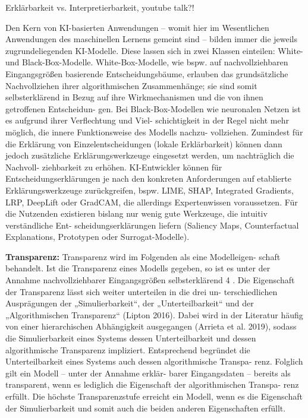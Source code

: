 \documentclass[11pt,a4paper]{article}
\numberwithin{equation}{section}
\begin{document}
	Erklärbarkeit vs. Interpretierbarkeit, youtube talk?!
	
	
	Den Kern von KI-basierten Anwendungen – womit hier im Wesentlichen Anwendungen des
	maschinellen Lernens gemeint sind – bilden immer die jeweils zugrundeliegenden KI-Modelle.
	Diese lassen sich in zwei Klassen einteilen: White- und Black-Box-Modelle. White-Box-Modelle,
	wie bspw. auf nachvollziehbaren Eingangsgrößen basierende Entscheidungsbäume, erlauben
	das grundsätzliche Nachvollziehen ihrer algorithmischen Zusammenhänge; sie sind somit
	selbsterklärend in Bezug auf ihre Wirkmechanismen und die von ihnen getroffenen Entscheidun-
	gen. Bei Black-Box-Modellen wie neuronalen Netzen ist es aufgrund ihrer Verflechtung und Viel-
	schichtigkeit in der Regel nicht mehr möglich, die innere Funktionsweise des Modells nachzu-
	vollziehen. Zumindest für die Erklärung von Einzelentscheidungen (lokale Erklärbarkeit) können
	dann jedoch zusätzliche Erklärungswerkzeuge eingesetzt werden, um nachträglich die Nachvoll-
	ziehbarkeit zu erhöhen. KI-Entwickler können für Entscheidungserklärungen je nach den
	konkreten Anforderungen auf etablierte Erklärungswerkzeuge zurückgreifen, bspw. LIME, SHAP,
	Integrated Gradients, LRP, DeepLift oder GradCAM, die allerdings Expertenwissen voraussetzen.
	Für die Nutzenden existieren bislang nur wenig gute Werkzeuge, die intuitiv verständliche Ent-
	scheidungserklärungen liefern (Saliency Maps, Counterfactual Explanations, Prototypen oder
	Surrogat-Modelle).
	
	\noindent \textbf{Transparenz: }
	Transparenz wird im Folgenden als eine Modelleigen-
	schaft behandelt. Ist die Transparenz eines Modells
	gegeben, so ist es unter der Annahme nachvollziehbarer
	Eingangsgrößen selbsterklärend 4 . Die Eigenschaft der
	Transparenz lässt sich weiter unterteilen in die drei un-
	terschiedlichen Ausprägungen der „Simulierbarkeit“, der
	„Unterteilbarkeit“ und der „Algorithmischen Transparenz“
	(Lipton 2016). Dabei wird in der Literatur häufig von einer
	hierarchischen Abhängigkeit ausgegangen (Arrieta et al.
	2019), sodass die Simulierbarkeit eines Systems dessen
	Unterteilbarkeit und dessen algorithmische Transparenz
	impliziert. Entsprechend begründet die Unterteilbarkeit
	eines Systems auch dessen algorithmische Transpa-
	renz. Folglich gilt ein Modell – unter der Annahme erklär-
	barer Eingangsdaten – bereits als transparent, wenn es
	lediglich die Eigenschaft der algorithmischen Transpa-
	renz erfüllt. Die höchste Transparenzstufe erreicht ein
	Modell, wenn es die Eigenschaft der Simulierbarkeit und
	somit auch die beiden anderen
	Eigenschaften erfüllt.
	
\end{document}
